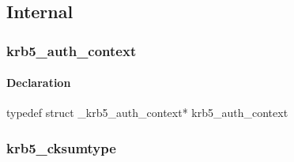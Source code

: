 \documentclass[letterpaper,10pt,english]{sphinxmanual}
\begin{document}

\begin{fulllineitems}
\label{appdev/refs/types/passwd_phrase_element:c.passwd_phrase_element.passwd}
\end{fulllineitems}


\begin{fulllineitems}
\label{appdev/refs/types/passwd_phrase_element:c.passwd_phrase_element.phrase}
\end{fulllineitems}



\subsection{Internal}
\label{appdev/refs/types/index:internal}

\subsubsection{krb5\_auth\_context}
\label{appdev/refs/types/krb5_auth_context:krb5-auth-context}\label{appdev/refs/types/krb5_auth_context::doc}\label{appdev/refs/types/krb5_auth_context:krb5-auth-context-struct}

\begin{fulllineitems}
\label{appdev/refs/types/krb5_auth_context:c.krb5_auth_context}
\end{fulllineitems}



\paragraph{Declaration}
\label{appdev/refs/types/krb5_auth_context:declaration}
typedef struct \_krb5\_auth\_context* krb5\_auth\_context


\subsubsection{krb5\_cksumtype}
\label{appdev/refs/types/krb5_cksumtype:krb5-cksumtype}\label{appdev/refs/types/krb5_cksumtype:krb5-cksumtype-struct}\label{appdev/refs/types/krb5_cksumtype::doc}
\end{document}
